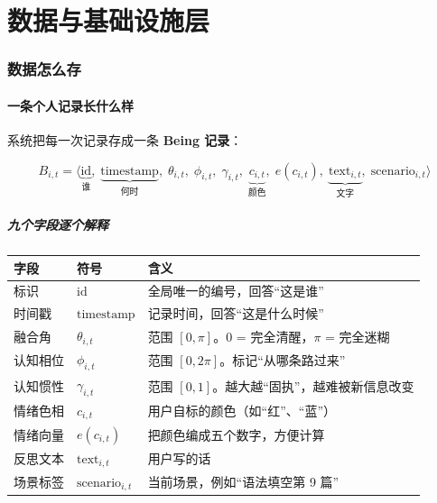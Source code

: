 \documentclass[UTF8,a4paper,11pt]{ctexart}
\newcommand{\term}[1]{\textbf{#1}}
\begin{document}
\part{数据与基础设施层}

\section{数据怎么存}

\subsection{一条个人记录长什么样}

系统把每一次记录存成一条 \term{Being 记录}：

\begin{equation}
B_{i,t} = \big\langle
\underbrace{\text{id}}_{\text{谁}},\;
\underbrace{\text{timestamp}}_{\text{何时}},\;
\theta_{i,t},\;
\phi_{i,t},\;
\gamma_{i,t},\;
\underbrace{c_{i,t}}_{\text{颜色}},\;
e(c_{i,t}),\;
\underbrace{\text{text}_{i,t}}_{\text{文字}},\;
\text{scenario}_{i,t}
\big\rangle
\label{p1:eq:being}
\end{equation}

\subsubsection{九个字段逐个解释}

\begin{longtable}{@{}p{2.2cm}p{2.4cm}p{10.2cm}@{}}
\toprule
\textbf{字段} & \textbf{符号} & \textbf{含义} \\
\midrule
标识 & $\text{id}$ & 全局唯一的编号，回答“这是谁” \\
时间戳 & $\text{timestamp}$ & 记录时间，回答“这是什么时候” \\
融合角 & $\theta_{i,t}$ & 范围 $[0, \pi]$。0 = 完全清醒，$\pi$ = 完全迷糊 \\
认知相位 & $\phi_{i,t}$ & 范围 $[0, 2\pi]$。标记“从哪条路过来” \\
认知惯性 & $\gamma_{i,t}$ & 范围 $[0, 1]$。越大越“固执”，越难被新信息改变 \\
情绪色相 & $c_{i,t}$ & 用户自标的颜色（如“红”、“蓝”） \\
情绪向量 & $e(c_{i,t})$ & 把颜色编成五个数字，方便计算 \\
反思文本 & $\text{text}_{i,t}$ & 用户写的话 \\
场景标签 & $\text{scenario}_{i,t}$ & 当前场景，例如“语法填空第 9 篇” \\
\bottomrule
\end{longtable}
\end{document}
